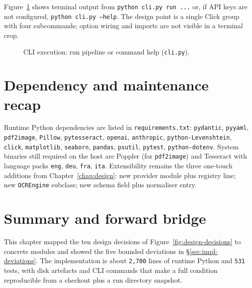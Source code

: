 Figure~\ref{fig:impl-run-cli} shows terminal output from
\texttt{python cli.py run ...} or, if API keys are not configured,
\texttt{python cli.py --help}. The design point is a single Click group
with four subcommands; option wiring and imports are not visible in a
terminal crop.

\begin{figure}[ht]
    \centering
    \caption{CLI execution: run pipeline or command help
    (\texttt{cli.py}).}
    \label{fig:impl-run-cli}
\end{figure}


\section{Dependency and maintenance recap}
\label{sec:impl-maintenance}

Runtime Python dependencies are listed in \texttt{requirements.txt}:
\texttt{pydantic}, \texttt{pyyaml}, \texttt{pdf2image},
\texttt{Pillow}, \texttt{pytesseract}, \texttt{openai},
\texttt{anthropic}, \texttt{python-Levenshtein}, \texttt{click},
\texttt{matplotlib}, \texttt{seaborn}, \texttt{pandas},
\texttt{psutil}, \texttt{pytest}, \texttt{python-dotenv}. System
binaries still required on the host are Poppler (for
\texttt{pdf2image}) and Tesseract with language packs
\texttt{eng}, \texttt{deu}, \texttt{fra}, \texttt{ita}. Extensibility
remains the three one-touch additions from
Chapter~\ref{chap:design}: new provider module plus registry line;
new \texttt{OCREngine} subclass; new schema field plus normaliser
entry.

\section{Summary and forward bridge}
\label{sec:impl-summary}

This chapter mapped the ten design decisions of
Figure~\ref{fig:design-decisions} to concrete modules and showed the
five bounded deviations in \S\ref{sec:impl-deviations}. The
implementation is about \texttt{2,700} lines of runtime Python and
\texttt{531} tests, with disk artefacts and CLI commands
that make a full condition reproducible from a checkout plus a run
directory snapshot.

